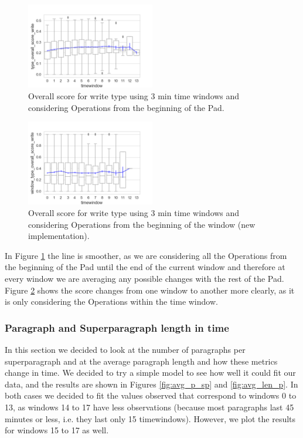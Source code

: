         \begin{figure}[htp!]
            \centering
            \includegraphics[width=0.5\textwidth]{figures/typeoverallscorewrite.png}
            \caption{Overall score for write type using 3 min time windows and considering Operations from the beginning of the Pad.}
            \label{fig:typeoverallscorewrite}
        \end{figure}
        \begin{figure}[htp!]
            \centering
            \includegraphics[width=0.5\textwidth]{figures/windowtypeoverallscorewrite.png}
            \caption{Overall score for write type using 3 min time windows and considering Operations from the beginning of the window (new implementation).}
            \label{fig:windowtypeoverallscorewrite}
        \end{figure}
        
        In Figure \ref{fig:typeoverallscorewrite} the line is smoother, as we are considering all the Operations from the beginning of the Pad until the end of the current window and therefore at every window we are averaging any possible changes with the rest of the Pad. Figure \ref{fig:windowtypeoverallscorewrite} shows the score changes from one window to another more clearly, as it is only considering the Operations within the time window. 
        
    \subsubsection{Paragraph and Superparagraph length in time} 
    In this section we decided to look at the number of paragraphs per superparagraph and at the average paragraph length and how these metrics change in time. We decided to try a simple model to see how well it could fit our data, and the results are shown in Figures \ref{fig:avg_p_sp} and \ref{fig:avg_len_p}. In both cases we decided to fit the values observed that correspond to windows 0 to 13, as windows 14 to 17 have less observations (because most paragraphs last 45 minutes or less, i.e. they last only 15 timewindows). However, we plot the results for windows 15 to 17 as well.
    
